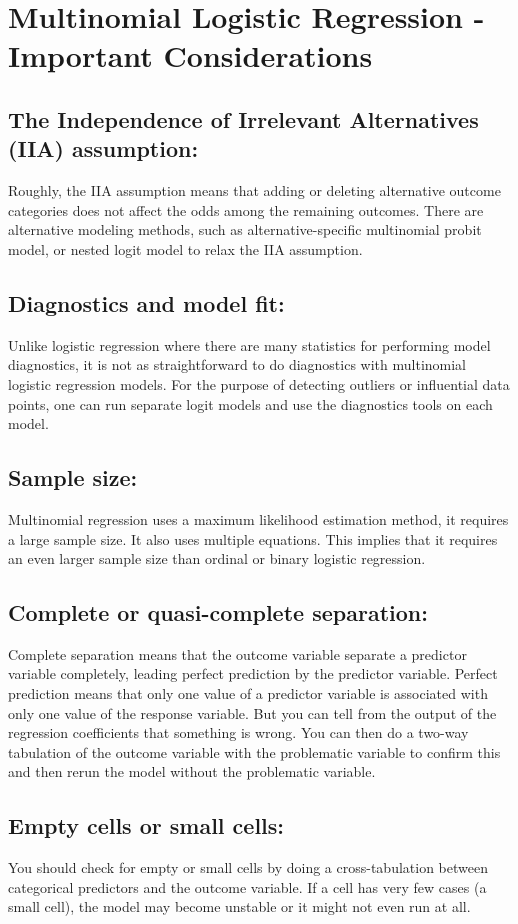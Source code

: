 \documentclass[]{article}
\begin{document}
\section*{Multinomial Logistic Regression - Important Considerations}

\subsection*{The Independence of Irrelevant Alternatives (IIA) assumption:} Roughly, the IIA assumption means that adding or deleting alternative outcome categories does not affect the odds among the remaining outcomes. There are alternative modeling methods, such as alternative-specific multinomial probit model, or nested logit model to relax the IIA assumption.
\subsection*{Diagnostics and model fit:} Unlike logistic regression where there are many statistics for performing model diagnostics, it is not as straightforward to do diagnostics with multinomial logistic regression models. For the purpose of detecting outliers or influential data points, one can run separate logit models and use the diagnostics tools on each model.
\subsection*{Sample size:} Multinomial regression uses a maximum likelihood estimation method, it requires a large sample size. It also uses multiple equations. This implies that it requires an even larger sample size than ordinal or binary logistic regression.
\subsection*{Complete or quasi-complete separation:} Complete separation means that the outcome variable separate a predictor variable completely, leading perfect prediction by the predictor variable.
Perfect prediction means that only one value of a predictor variable is associated with only one value of the response variable. But you can tell from the output of the regression coefficients that something is wrong. You can then do a two-way tabulation of the outcome variable with the problematic variable to confirm this and then rerun the model without the problematic variable.
\subsection*{Empty cells or small cells:} You should check for empty or small cells by doing a cross-tabulation between categorical predictors and the outcome variable. If a cell has very few cases (a small cell), the model may become unstable or it might not even run at all.
\end{document}
